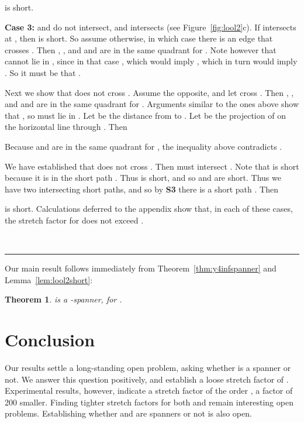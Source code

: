 \pdfoutput=1  \documentclass[11pt]{article}
\newtheorem{theorem}{Theorem}
\newcommand{\qed}{\rule{0.5em}{1.5ex}}
\newcommand{\fqed}{{\hfill~\qed}}
\newenvironment{proof}{{\noindent \bf Proof.}}
                      {{\hfill \fqed} \vspace{1em}}
\begin{document}
\begin{proof}
\begin{enumerate}
is short.

\end{enumerate}

\medskip
\noindent
{\bf Case 3:}  and  do not intersect,
and  intersects  (see Figure~\ref{fig:lool2}c).
If  intersects  at , then
 is short.
So assume otherwise, in which case
there is an edge  that
crosses .
Then , , and  and  are in
the same quadrant for . Note however that  cannot lie in
, since in that case , which would imply
, which in turn would imply .
So it must be that .

Next we show that  does not cross . Assume the opposite,
and let  cross . Then
, , and  and  are in
the same quadrant for . Arguments similar to the ones above show that
, so  must lie in . Let  be the 
distance from  to . Let  be the projection of  on the horizontal
line through . Then

Because  and  are in the same quadrant for , the inequality above
contradicts .

We have established that  does not cross . Then
 must intersect .
Note that  is short because it is in the short path .
Thus  is short, and so  and 
are short.
Thus we have two intersecting short paths, and so by {\bf S3}
there is a short path .
Then

is short. Calculations deferred to the appendix show that, in each of these cases, the
stretch factor for  does not exceed .
\end{proof}

\noindent
Our main result follows immediately from Theorem~\ref{thm:y4infspanner} and Lemma~\ref{lem:lool2short}:

\begin{theorem}
 is a -spanner, for .
\end{theorem}

\section{Conclusion}
Our results settle a long-standing open problem, asking whether 
is a spanner or not. We answer this question positively, and
establish a loose stretch factor of .
Experimental results, however, indicate a stretch factor of the
order , a factor of 200 smaller.
Finding tighter stretch factors for both  and 
remain interesting open problems. Establishing
whether  and  are spanners or not is also open. 

\noindent
\end{document}
